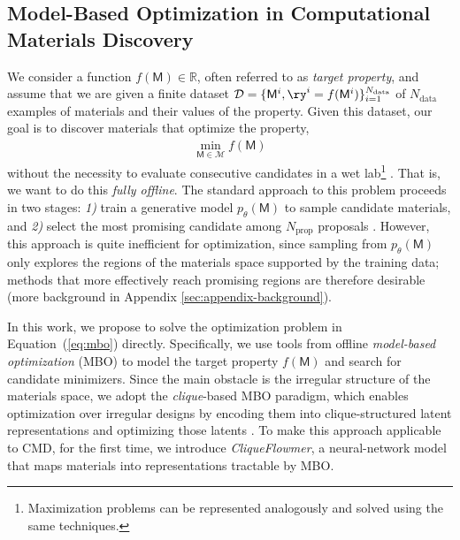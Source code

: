 \documentclass{article}
\theoremstyle{plain}
\theoremstyle{definition}
\theoremstyle{remark}
\begin{document}
\subsection{Model-Based Optimization in Computational Materials Discovery}
We consider a function $f(\mathsf{M})\in\mathbb{R}$, often referred to as \emph{target property}, and assume that we are given a finite dataset $\mathcal{D}=\{\mathsf{M}^{i}, \ry^i=f(\mathsf{M}^i)\}_{i=1}^{N_{\text{data}}}$ of $N_{\text{data}}$ examples of materials and their values of the property.
Given this dataset, our goal is to discover materials that optimize the property,
\begin{align}
    \min_{\mathsf{M} \in\mathcal{M}} f(\mathsf{M})
    \label{eq:mbo}
\end{align}
without the necessity to evaluate consecutive candidates in a wet lab\footnote{Maximization problems can be represented analogously and solved using the same techniques.} \citep{danielson1997combinatorial}.
That is, we want to do this \emph{fully offline}.
The standard approach to this problem proceeds in two stages: \emph{1)} train a generative model $p_{\theta}(\mathsf{M})$ to sample candidate materials, and \emph{2)} select the most promising candidate among $N_{\text{prop}}$ proposals \citep{gomez2018automatic, noh2019inverse, park2024has, zeni2025generative}.
However, this approach is quite inefficient for optimization, since sampling from $p_{\theta}(\mathsf{M})$ only explores the regions of the materials space supported by the training data; methods that more effectively reach promising regions are therefore desirable (more background in Appendix \ref{sec:appendix-background}).

In this work, we propose to solve the optimization problem in Equation~(\ref{eq:mbo}) directly. 
Specifically, we use tools from offline \emph{model-based optimization} (MBO) to model the target property $f(\mathsf{M})$ and search for candidate minimizers. 
Since the main obstacle is the irregular structure of the materials space, we adopt the \emph{clique}-based MBO paradigm, which enables optimization over irregular designs by encoding them into clique-structured latent representations and optimizing those latents \citep{kuba2024cliqueformer}. 
To make this approach applicable to CMD, for the first time, we introduce \emph{CliqueFlowmer}, a neural-network model that maps materials into representations tractable by MBO.


\vspace{-5pt}
\end{document}
